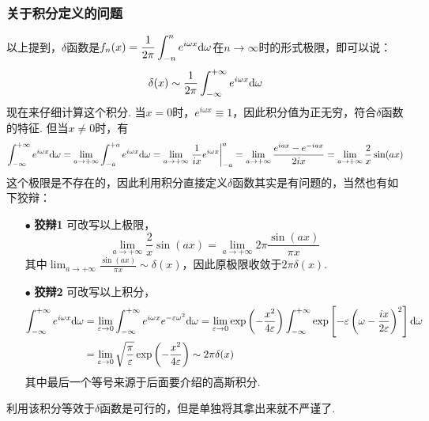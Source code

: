 \documentclass[main.tex]{subfiles}
\begin{document}
\subsubsection{关于积分定义的问题}

以上提到，\(\delta\)函数是\(\displaystyle{f_n(x) = \frac{1}{2\pi}\int_{-n}^{n}e^{i\omega x}{\rm d}\omega}\)在\(n \to \infty\)时的形式极限，即可以说：
\[\delta(x) \sim \frac{1}{2\pi}\int_{-\infty}^{+\infty}e^{i\omega x}{\rm d}\omega\]
现在来仔细计算这个积分. 当\(x=0\)时，\(e^{i\omega x} \equiv 1\)，因此积分值为正无穷，符合\(\delta\)函数的特征. 但当\(x \neq 0\)时，有
\[\int_{-\infty}^{+\infty}e^{i\omega x}{\rm d}\omega = \lim_{a \to +\infty} \int_{-a}^{+a}e^{i\omega x}{\rm d}\omega = \lim_{a \to +\infty}\left.\frac{1}{ix}e^{i\omega x}\right|_{-a}^{a} = \lim_{a \to +\infty}\frac{e^{iax}-e^{-iax}}{2ix} = \lim_{a \to +\infty}\frac{2}{x}\sin(ax)\]
这个极限是不存在的，因此利用积分直接定义\(\delta\)函数其实是有问题的，当然也有如下狡辩：
\begin{itemize}
    \item [\(\bullet\)] \textbf{狡辩1} 可改写以上极限，
    \[\lim_{a \to +\infty}\frac{2}{x}\sin(ax) = \lim_{a \to +\infty}2\pi \frac{\sin(ax)}{\pi x}\] 
    其中\(\displaystyle{\lim_{a \to +\infty}\frac{\sin(ax)}{\pi x} \sim \delta(x)}\)，因此原极限收敛于\(2\pi\delta(x)\).
    \item[\(\bullet\)] \textbf{狡辩2} 可改写以上积分，
    \begin{align*}
        \int_{-\infty}^{+\infty}e^{i\omega x}{\rm d}\omega &= \lim_{\varepsilon \to 0}\int_{-\infty}^{+\infty}e^{i\omega x}e^{-\varepsilon\omega^2}{\rm d}\omega = \lim_{\varepsilon \to 0}\exp\left(-\frac{x^2}{4\varepsilon}\right)\int_{-\infty}^{+\infty}\exp\left[-\varepsilon\left(\omega-\frac{ix}{2\varepsilon}\right)^2\right]{\rm d}\omega \\
        &= \lim_{\varepsilon \to 0}\sqrt{\frac{\pi}{\varepsilon}}\exp\left(-\frac{x^2}{4\varepsilon}\right) \sim 2\pi \delta(x)
    \end{align*}
    其中最后一个等号来源于后面要介绍的高斯积分.
\end{itemize}

利用该积分等效于\(\delta\)函数是可行的，但是单独将其拿出来就不严谨了. 
\end{document}
